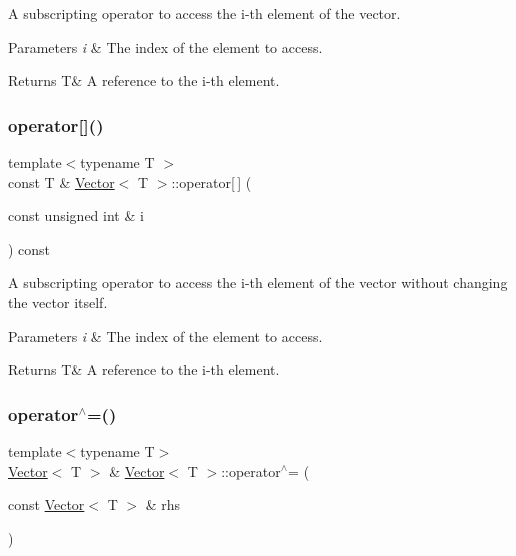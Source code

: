 A subscripting operator to access the {\ttfamily i}-\/th element of the vector. 


\begin{DoxyParams}{Parameters}
{\em i} & The index of the element to access. \\
\hline
\end{DoxyParams}
\begin{DoxyReturn}{Returns}
T\& A reference to the {\ttfamily i}-\/th element. 
\end{DoxyReturn}
\mbox{\label{classVector_a36cc881f0270de628bec7a80bbdab741}} 
\subsubsection{\texorpdfstring{operator[]()}{operator[]()}\hspace{0.1cm}{\footnotesize\ttfamily [2/2]}}
{\footnotesize\ttfamily template$<$typename T $>$ \\
const T \& \mbox{\hyperlink{classVector}{Vector}}$<$ T $>$\+::operator\mbox{[}$\,$\mbox{]} (\begin{DoxyParamCaption}\item[{const unsigned int \&}]{i }\end{DoxyParamCaption}) const\hspace{0.3cm}{\ttfamily [inline]}}



A subscripting operator to access the {\ttfamily i}-\/th element of the vector without changing the vector itself. 


\begin{DoxyParams}{Parameters}
{\em i} & The index of the element to access. \\
\hline
\end{DoxyParams}
\begin{DoxyReturn}{Returns}
T\& A reference to the {\ttfamily i}-\/th element. 
\end{DoxyReturn}
\mbox{\label{classVector_acd4d558272832a19d614468400ca605d}} 
\subsubsection{\texorpdfstring{operator$^\wedge$=()}{operator^=()}\hspace{0.1cm}{\footnotesize\ttfamily [1/2]}}
{\footnotesize\ttfamily template$<$typename T$>$ \\
\mbox{\hyperlink{classVector}{Vector}}$<$ T $>$ \& \mbox{\hyperlink{classVector}{Vector}}$<$ T $>$\+::operator$^\wedge$= (\begin{DoxyParamCaption}\item[{const \mbox{\hyperlink{classVector}{Vector}}$<$ T $>$ \&}]{rhs }\end{DoxyParamCaption})\hspace{0.3cm}{\ttfamily [inline]}}



